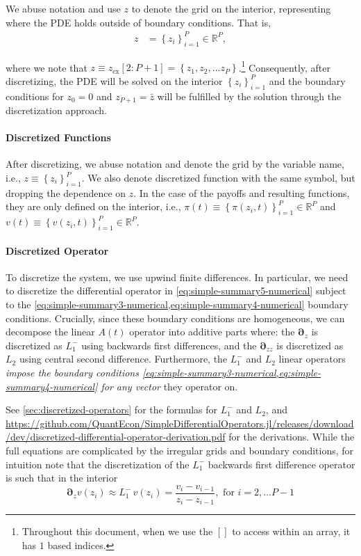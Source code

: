 \documentclass[11pt]{article}
\newcommand{\D}[1][]{\ensuremath{\boldsymbol{\partial}_{#1}}}
\newcommand{\R}{\ensuremath{\mathbb{R}}}
\newcommand{\ex}{\ensuremath{\mathrm{ex}}}
\newcommand{\set}[1]{\ensuremath{\left\{{#1}\right\}}}
\begin{document}
We abuse notation and use $z$ to denote the grid on the interior, representing where the PDE holds outside of boundary conditions.  That is,
\begin{align}
	z &= \set{z_i}_{i=1}^P \in \R^{P},
\end{align}

where we note that $z \equiv z_{\ex}[2:P+1] = \set{z_1, z_2, \ldots z_P}$.\footnote{Throughout this document, when we use the $[ ]$ to access within an array, it has $1$ based indices.}  Consequently, after discretizing, the PDE will be solved on the interior $\set{z_i}_{i=1}^P$ and the boundary conditions for $z_0 = 0$ and $z_{P+1} = \bar{z}$ will be fulfilled by the solution through the discretization approach.

\paragraph{Discretized Functions}

After discretizing, we abuse notation and denote the grid by the variable name, i.e., $z \equiv \set{z_i}_{i=1}^{P}$.  We also denote discretized function with the same symbol, but dropping the dependence on $z$.  In the case of the payoffs and resulting functions, they are only defined on the interior, i.e., $\pi(t) \equiv \set{\pi(z_i,t)}_{i=1}^P\in \R^P$ and $v(t) \equiv \set{v(z_i,t)}_{i=1}^P\in \R^P$.

\paragraph{Discretized Operator}

To discretize the system, we use upwind finite differences.  In particular, we need to discretize the differential operator in \cref{eq:simple-summary5-numerical} subject to the \cref{eq:simple-summary3-numerical,eq:simple-summary4-numerical} boundary conditions.  Crucially, since these boundary conditions are homogeneous, we can decompose the linear $A(t)$ operator into additive parts where: the $\D[z]$ is discretized as $L^{-}_1$ using backwards first differences, and the $\D[zz]$ is discretized as $L_2$ using central second difference.   Furthermore, the $L^{-}_1$ and $L_2$ linear operators \textit{impose the boundary conditions \cref{eq:simple-summary3-numerical,eq:simple-summary4-numerical} for any vector} they operator on.

See \cref{sec:discretized-operators} for the formulas for $L_1^-$ and $L_2$, and \url{https://github.com/QuantEcon/SimpleDifferentialOperators.jl/releases/download/dev/discretized-differential-operator-derivation.pdf} for the derivations.  While the full equations are complicated by the irregular grids and boundary conditions, for intuition note that the discretization of the $L_1^-$ backwards first difference operator is such that in the interior
$$
\D[z] v(z_i) \approx L_1^{-}\, v(z_i) = \frac{v_i - v_{i-1}}{z_i - z_{i-1}},\text{ for } i = 2, \ldots P-1
$$
\end{document}
